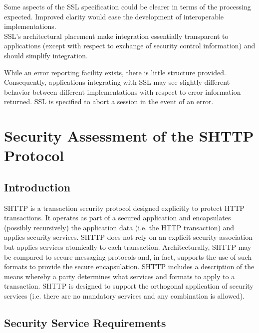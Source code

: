   Some aspects of the SSL specification could be clearer in terms of the
  processing expected. Improved clarity would ease the development of
  interoperable implementations.\\
  
  SSL's architectural placement make integration essentially transparent to
  applications (except with respect to exchange of security control
  information) and should simplify integration.

  
  While an error reporting facility exists, there is little structure
  provided. Consequently, applications integrating with SSL may see
  slightly different behavior between different implementations with
  respect to error information returned. SSL is specified to abort a
  session in the event of an error.
\latexhtml{\end{itemize}}{\end{htmllist}}


\section{Security Assessment of the SHTTP Protocol}

\subsection{Introduction}

SHTTP is a transaction security protocol designed explicitly to protect
HTTP transactions. It operates as part of a secured application and
encapsulates (possibly recursively) the application data (i.e. the HTTP
transaction) and applies security services. SHTTP does not rely on an
explicit security association but applies services atomically to each
transaction. Architecturally, SHTTP may be compared to secure messaging
protocols and, in fact, supports the use of such formats to provide the
secure encapsulation. SHTTP includes a description of the means whereby
a party determines what services and formats to apply to a transaction.
SHTTP is designed to support the orthogonal application of security
services (i.e. there are no mandatory services and any combination is
allowed).

\subsection{Security Service Requirements}

